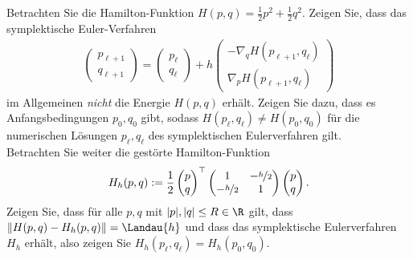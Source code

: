 \begin{exercise}
  Betrachten Sie die Hamilton-Funktion $H(p,q) = \frac{1}{2}p^2 + \frac{1}{2}q^2$.
  Zeigen Sie, dass das symplektische Euler-Verfahren
  \begin{align}
    \begin{pmatrix}
      p_{\ell + 1} \\ q_{\ell + 1}
    \end{pmatrix}
    = \begin{pmatrix}
      p_{\ell} \\ q_{\ell}
    \end{pmatrix} +
    h\begin{pmatrix}
      -\nabla_q H(p_{\ell + 1},q_{\ell}) \\
      \nabla_p H(p_{\ell + 1},q_{\ell})
    \end{pmatrix}
  \end{align}
  im Allgemeinen \textit{nicht} die Energie $H(p,q)$ erhält. Zeigen Sie dazu,
  dass es Anfangsbedingungen $p_0,q_0$ gibt, sodass $H(p_{\ell},q_{\ell})
  \neq H(p_0,q_0)$ für die numerischen Lösungen $p_{\ell},q_{\ell}$ des
  symplektischen Eulerverfahren gilt. \\
  Betrachten Sie weiter die gestörte Hamilton-Funktion
  \begin{align}
    H_h(p,q) := \frac{1}{2}\begin{pmatrix}
      p \\ q
    \end{pmatrix}^{\top}
    \begin{pmatrix}
      1 & - \nicefrac{h}{2} \\ -\nicefrac{h}{2} & 1
    \end{pmatrix}
    \begin{pmatrix}
      p \\ q
    \end{pmatrix}.
  \end{align}
  Zeigen Sie, dass für alle $p,q$ mit $|p|,|q| \leq R \in \R$ gilt, dass
  $\|H(p,q) - H_h(p,q)\| = \Landau{h}$ und dass das symplektische Eulerverfahren
  $H_h$ erhält, also zeigen Sie $H_h(p_{\ell},q_{\ell}) = H_h(p_0,q_0)$.
\end{exercise}

